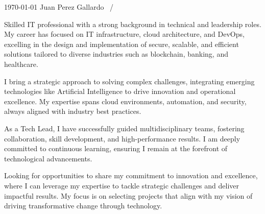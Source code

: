 \documentclass[11pt, a4paper]{awesome-cv}
\begin{document}
\makecvheader

\makecvfooter
  {\today}
  {Juan Perez Gallardo}
  {\thepage~/~\pageref{LastPage} }

\vspace{-10pt}

\begin{cvparagraph}

Skilled IT professional with a strong background in technical and leadership roles. My career has focused on IT infrastructure, cloud architecture, and DevOps, excelling in the design and implementation of secure, scalable, and efficient solutions tailored to diverse industries such as blockchain, banking, and healthcare.

I bring a strategic approach to solving complex challenges, integrating emerging technologies like Artificial Intelligence to drive innovation and operational excellence. My expertise spans cloud environments, automation, and security, always aligned with industry best practices.

As a Tech Lead, I have successfully guided multidisciplinary teams, fostering collaboration, skill development, and high-performance results. I am deeply committed to continuous learning, ensuring I remain at the forefront of technological advancements.

Looking for opportunities to share my commitment to innovation and excellence, where I can leverage my expertise to tackle strategic challenges and deliver impactful results. My focus is on selecting projects that align with my vision of driving transformative change through technology.
\end{cvparagraph}

\vspace{-10pt}
\end{document}
